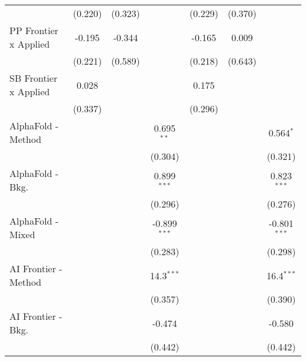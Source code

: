 \begin{tabular}{lcccccc}
                                  & (0.220)        & (0.323)        &                & (0.229)        & (0.370)        &   \\   
   PP Frontier x Applied          & -0.195         & -0.344         &                & -0.165         & 0.009          &   \\   
                                  & (0.221)        & (0.589)        &                & (0.218)        & (0.643)        &   \\   
   SB Frontier x Applied          & 0.028          &                &                & 0.175          &                &   \\   
                                  & (0.337)        &                &                & (0.296)        &                &   \\   
   AlphaFold - Method             &                &                & 0.695$^{**}$   &                &                & 0.564$^{*}$\\   
                                  &                &                & (0.304)        &                &                & (0.321)\\   
   AlphaFold - Bkg.               &                &                & 0.899$^{***}$  &                &                & 0.823$^{***}$\\   
                                  &                &                & (0.296)        &                &                & (0.276)\\   
   AlphaFold - Mixed              &                &                & -0.899$^{***}$ &                &                & -0.801$^{***}$\\   
                                  &                &                & (0.283)        &                &                & (0.298)\\   
   AI Frontier - Method           &                &                & 14.3$^{***}$   &                &                & 16.4$^{***}$\\   
                                  &                &                & (0.357)        &                &                & (0.390)\\   
   AI Frontier - Bkg.             &                &                & -0.474         &                &                & -0.580\\   
                                  &                &                & (0.442)        &                &                & (0.442)\\   

\end{tabular}
